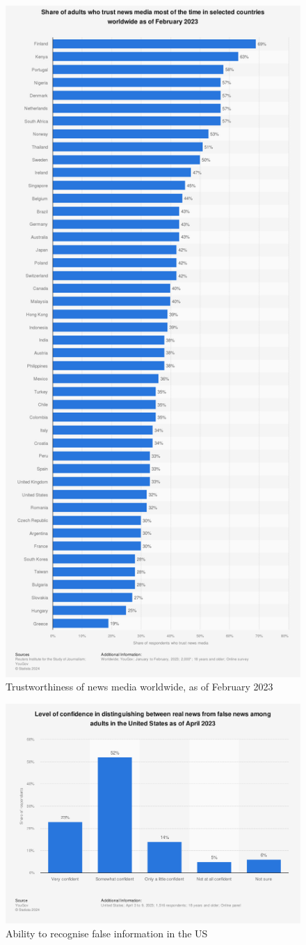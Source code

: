 \begin{figure}[htbp]
    \centering
    \includegraphics[width=0.6\linewidth]{images/statistic_id308468_trustworthiness-of-news-media-worldwide-2023.png}
    \caption{Trustworthiness of news media worldwide, as of February 2023 \cite{reuters-2023-trust}}
    \label{fig:trustworthiness-of-news-media-worldwide-2023}
\end{figure}


\begin{figure}[htbp]
    \centering
    \includegraphics[width=0.9\linewidth]{images/statistic_id657090_ability-to-recognize-false-information-and-news-in-the-us-2023.png}
    \caption{Ability to recognise false information in the US \cite{yougov-2023-confidence}}
    \label{fig:ability-to-recognize-false-information-and-news-in-the-us-2023}
\end{figure}

